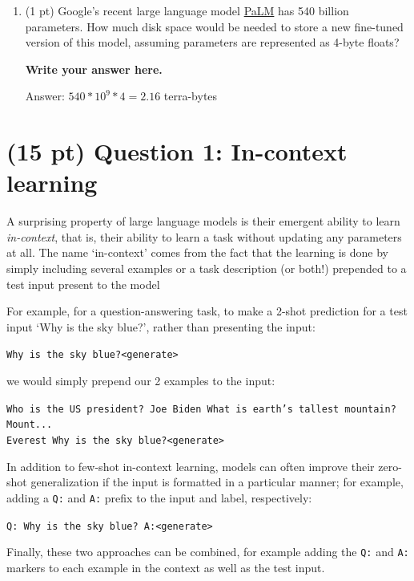 \documentclass[12pt]{article}
\begin{document}
\begin{enumerate}
    \textbf{\color{red} Write your answer here.}

    Answer: $ 11.2 * 10^6 * 4 = 44.8 $ mega-bytes

    \item (1 pt) Google's recent large language model \href{https://storage.googleapis.com/pathways-language-model/PaLM-paper.pdf}{PaLM} has 540 billion parameters. How much disk space would be needed to store a new fine-tuned version of this model, assuming parameters are represented as 4-byte floats?

    \textbf{\color{red} Write your answer here.}

    Answer: $ 540 * 10^9 * 4 = 2.16 $ terra-bytes

\end{enumerate}

\section*{(15 pt) Question 1: In-context learning}
A surprising property of large language models is their emergent ability to learn \textit{in-context}, that is, their ability to learn a task without updating any parameters at all. The name `in-context' comes from the fact that the learning is done by simply including several examples or a task description (or both!) prepended to a test input present to the model

For example, for a question-answering task, to make a 2-shot prediction for a test input `Why is the sky blue?', rather than presenting the input:

\texttt{Why is the sky blue?\textless generate\textgreater}

we would simply prepend our 2 examples to the input:

\texttt{Who is the US president? Joe Biden What is earth's tallest mountain? Mount... \\
Everest Why is the sky blue?\textless generate\textgreater}

In addition to few-shot in-context learning, models can often improve their zero-shot generalization if the input is formatted in a particular manner; for example, adding a \texttt{Q:} and \texttt{A:} prefix to the input and label, respectively:

\texttt{Q: Why is the sky blue? A:\textless generate\textgreater}

Finally, these two approaches can be combined, for example adding the \texttt{Q:} and \texttt{A:} markers to each example in the context as well as the test input.
\end{document}
